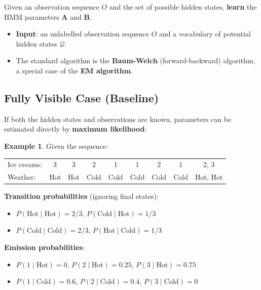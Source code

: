 \documentclass[11pt,a4paper]{article}
\theoremstyle{definition}
\newtheorem{example}{Example}[section]
\theoremstyle{plain}
\theoremstyle{remark}
\begin{document}
Given an observation sequence $O$ and the set of possible hidden states, \textbf{learn} the HMM parameters $\mathbf{A}$ and $\mathbf{B}$.

\begin{itemize}
    \item \textbf{Input}: an unlabelled observation sequence $O$ and a vocabulary of potential hidden states $\mathcal{Q}$.
    \item The standard algorithm is the \textbf{Baum-Welch} (forward-backward) algorithm, a special case of the \textbf{EM algorithm}.
\end{itemize}

\subsection{Fully Visible Case (Baseline)}

If both the hidden states and observations are known, parameters can be estimated directly by \textbf{maximum likelihood}:

\begin{example}
Given the sequence:
\begin{center}
\begin{tabular}{lcccccccc}
Ice creams: & 3 & 3 & 2 & 1 & 1 & 2 & 1 & 2, 3 \\
Weather: & Hot & Hot & Cold & Cold & Cold & Cold & Cold & Hot, Hot \\
\end{tabular}
\end{center}

\textbf{Transition probabilities} (ignoring final states):
\begin{itemize}
    \item $P(\text{Hot}\mid\text{Hot}) = 2/3$, \quad $P(\text{Cold}\mid\text{Hot}) = 1/3$
    \item $P(\text{Cold}\mid\text{Cold}) = 2/3$, \quad $P(\text{Hot}\mid\text{Cold}) = 1/3$
\end{itemize}

\textbf{Emission probabilities}:
\begin{itemize}
    \item $P(1\mid\text{Hot}) = 0$, \; $P(2\mid\text{Hot}) = 0.25$, \; $P(3\mid\text{Hot}) = 0.75$
    \item $P(1\mid\text{Cold}) = 0.6$, \; $P(2\mid\text{Cold}) = 0.4$, \; $P(3\mid\text{Cold}) = 0$
\end{itemize}
\end{example}
\end{document}
